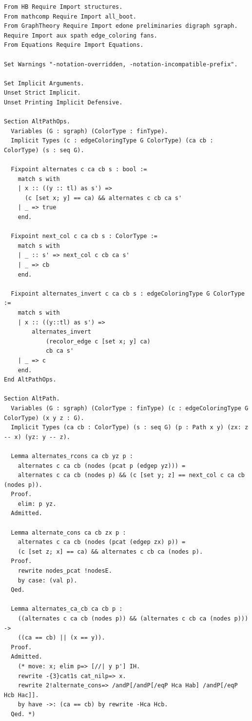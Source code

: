 \begin{verbatim}
From HB Require Import structures.
From mathcomp Require Import all_boot.
From GraphTheory Require Import edone preliminaries digraph sgraph.
Require Import aux spath edge_coloring fans.
From Equations Require Import Equations.

Set Warnings "-notation-overridden, -notation-incompatible-prefix".

Set Implicit Arguments.
Unset Strict Implicit.
Unset Printing Implicit Defensive.

Section AltPathOps.
  Variables (G : sgraph) (ColorType : finType).
  Implicit Types (c : edgeColoringType G ColorType) (ca cb : ColorType) (s : seq G).

  Fixpoint alternates c ca cb s : bool := 
    match s with 
    | x :: ((y :: tl) as s') =>
      (c [set x; y] == ca) && alternates c cb ca s'
    | _ => true
    end.

  Fixpoint next_col c ca cb s : ColorType := 
    match s with 
    | _ :: s' => next_col c cb ca s'
    | _ => cb
    end.

  Fixpoint alternates_invert c ca cb s : edgeColoringType G ColorType :=
    match s with
    | x :: ((y::tl) as s') =>
        alternates_invert
            (recolor_edge c [set x; y] ca)
            cb ca s'
    | _ => c
    end.
End AltPathOps.
  
Section AltPath.
  Variables (G : sgraph) (ColorType : finType) (c : edgeColoringType G ColorType) (x y z : G).
  Implicit Types (ca cb : ColorType) (s : seq G) (p : Path x y) (zx: z -- x) (yz: y -- z).
  
  Lemma alternates_rcons ca cb yz p : 
    alternates c ca cb (nodes (pcat p (edgep yz))) = 
    alternates c ca cb (nodes p) && (c [set y; z] == next_col c ca cb (nodes p)).
  Proof.
    elim: p yz.
  Admitted.

  Lemma alternate_cons ca cb zx p :
    alternates c ca cb (nodes (pcat (edgep zx) p)) = 
    (c [set z; x] == ca) && alternates c cb ca (nodes p).
  Proof.
    rewrite nodes_pcat !nodesE.
    by case: (val p).
  Qed.

  Lemma alternates_ca_cb ca cb p :
    ((alternates c ca cb (nodes p)) && (alternates c cb ca (nodes p))) -> 
    ((ca == cb) || (x == y)).
  Proof.
  Admitted.
    (* move: x; elim p=> [//| y p'] IH. 
    rewrite -{3}cat1s cat_nilp=> x.
    rewrite 2!alternate_cons=> /andP[/andP[/eqP Hca Hab] /andP[/eqP Hcb Hac]].
    by have ->: (ca == cb) by rewrite -Hca Hcb.
  Qed. *)


\end{verbatim}
